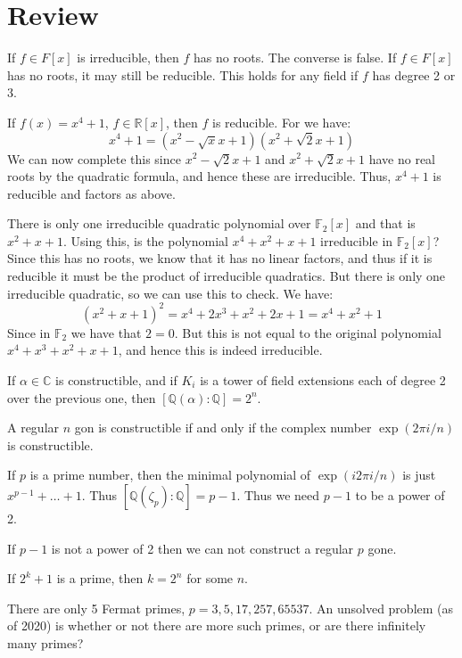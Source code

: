 \documentclass{article}                                                        %
\begin{document}
    \section{Review}
        If $f\in{F}[x]$ is irreducible, then $f$ has no roots. The converse is
        false. If $f\in{F}[x]$ has no roots, it may still be reducible. This
        holds for any field if $f$ has degree 2 or 3.
        \begin{example}
            If $f(x)=x^{4}+1$, $f\in\mathbb{R}[x]$, then $f$ is reducible. For
            we have:
            \begin{equation}
                x^{4}+1=(x^{2}-\sqrt{x}x+1)(x^{2}+\sqrt{2}x+1)
            \end{equation}
            We can now complete this since $x^{2}-\sqrt{2}x+1$ and
            $x^{2}+\sqrt{2}x+1$ have no real roots by the quadratic formula,
            and hence these are irreducible. Thus, $x^{4}+1$ is reducible and
            factors as above.
        \end{example}
        \begin{example}
            There is only one irreducible quadratic polynomial over
            $\mathbb{F}_{2}[x]$ and that is $x^{2}+x+1$. Using this, is the
            polynomial $x^{4}+x^{2}+x+1$ irreducible in $\mathbb{F}_{2}[x]$?
            Since this has no roots, we know that it has no linear factors, and
            thus if it is reducible it must be the product of irreducible
            quadratics. But there is only one irreducible quadratic, so we can
            use this to check. We have:
            \begin{equation}
                (x^{2}+x+1)^{2}=
                x^{4}+2x^{3}+x^{2}+2x+1=x^{4}+x^{2}+1
            \end{equation}
            Since in $\mathbb{F}_{2}$ we have that $2=0$. But this is not equal
            to the original polynomial $x^{4}+x^{3}+x^{2}+x+1$, and hence
            this is indeed irreducible.
        \end{example}
        If $\alpha\in\mathbb{C}$ is constructible, and if
        $K_{i}$ is a tower of field extensions each of degree 2 over the
        previous one, then $[\mathbb{Q}(\alpha):\mathbb{Q}]=2^{n}$.
        \begin{theorem}
            A regular $n$ gon is constructible if and only if the complex number
            $\exp(2\pi{i}/n)$ is constructible.
        \end{theorem}
        If $p$ is a prime number, then the minimal polynomial of
        $\exp(i2\pi{i}/n)$ is just $x^{p-1}+\dots+1$. Thus
        $[\mathbb{Q}(\zeta_{p}):\mathbb{Q}]=p-1$. Thus we need $p-1$ to be a
        power of 2.
        \begin{theorem}
            If $p-1$ is not a power of 2 then we can not construct a regular
            $p$ gone.
        \end{theorem}
        \begin{theorem}
            If $2^{k}+1$ is a prime, then $k=2^{n}$ for some $n$.
        \end{theorem}
        There are only 5 Fermat primes, $p=3,5,17,257,65537$. An unsolved
        problem (as of 2020) is whether or not there are more such primes, or
        are there infinitely many primes? 
\end{document}
